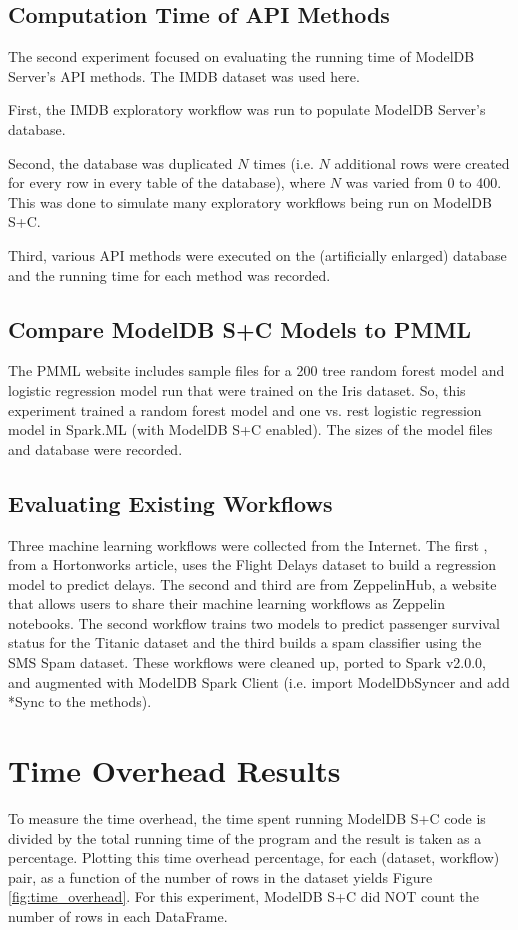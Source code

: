 \subsection{Computation Time of API Methods}
The second experiment focused on evaluating the running time of ModelDB Server's API methods. The
IMDB dataset was used here.

First, the IMDB exploratory workflow was run to populate ModelDB Server's database.

Second, the database was duplicated $N$ times (i.e. $N$ additional rows were created for
every row in every table of the database), where $N$ was varied from 0 to 400. This was
done to simulate many exploratory workflows being run on ModelDB S+C.

Third, various API methods were executed on the (artificially enlarged) database and the
running time for each method was recorded.

\subsection{Compare ModelDB S+C Models to PMML}
The PMML website \cite{pmmlwebsite} includes sample files for a 200 tree random forest model
and logistic regression model run that were trained on the Iris dataset. So, this
experiment trained a random forest model and one vs. rest logistic regression model
in Spark.ML (with ModelDB S+C enabled). The sizes of the model files and database
were recorded.

\subsection{Evaluating Existing Workflows}
Three machine learning workflows were collected from the Internet. The first \cite{flightworkflow}, from
a Hortonworks article, uses the Flight Delays dataset to build a regression model to predict
delays. The second \cite{titanicworkflow} and third \cite{spamworkflow} are from ZeppelinHub, a website that allows users to share their
machine learning workflows as Zeppelin notebooks. The second workflow trains two models
to predict passenger survival status for the Titanic dataset and the third builds a spam classifier
using the SMS Spam dataset. These workflows were cleaned up, ported to Spark v2.0.0, and 
augmented with ModelDB Spark Client (i.e. import ModelDbSyncer and add *Sync to the methods).

\section{Time Overhead Results}
To measure the time overhead, the time spent running ModelDB S+C code is divided 
by the total running time of the program and the result is taken as a percentage.
Plotting this time overhead percentage, for each (dataset, workflow) pair,
as a function of the number of rows in the dataset yields Figure \ref{fig:time_overhead}.
For this experiment, ModelDB S+C did NOT count the number of rows in each DataFrame.

